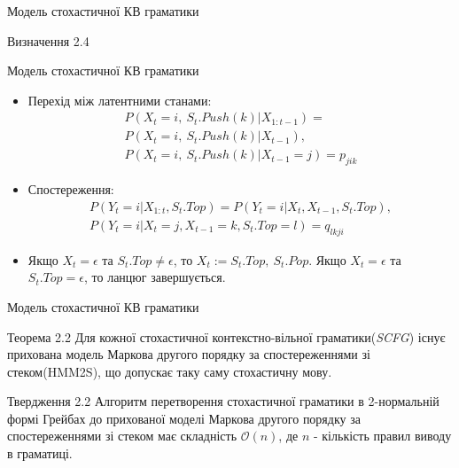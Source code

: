 \documentclass{beamer}
\begin{document}
\begin{darkframes}
\begin{frame}{Модель стохастичної КВ граматики}
\begin{exampleblock}{Визначення 2.4}
\begin{itemize}
        \end{itemize}
      \end{exampleblock}
    \end{frame}

    \begin{frame}{Модель стохастичної КВ граматики}
      \begin{itemize}
        \item Перехід між латентними станами:
        \begin{multline}
          P(X_t = i,\ S_t.Push(k) | X_{1:t-1}) = \\
          P(X_t = i,\ S_t.Push(k) | X_{t-1}),\\
          P(X_t = i,\ S_t.Push(k) | X_{t-1} = j) = p_{jik}
        \end{multline}
        \item Спостереження:
        \begin{multline}
          P(Y_t = i | X_{1:t}, S_t.Top ) = P(Y_t = i | X_t, X_{t-1}, S_t.Top),\\
          P(Y_t = i | X_t = j, X_{t-1} = k, S_t.Top = l) = q_{lkji}
        \end{multline}
        \item Якщо $X_t = \epsilon$ та $ S_t.Top \neq \epsilon $, то $ X_t := S_t.Top,\ S_t.Pop $. Якщо $X_t = \epsilon$ та $ S_t.Top = \epsilon $, то ланцюг завершується.
      \end{itemize}
    \end{frame}

    \begin{frame}{Модель стохастичної КВ граматики}
      \begin{block}{Теорема 2.2}
        Для кожної стохастичної контекстно-вільної граматики(\textit{SCFG}) існує прихована модель Маркова другого порядку за спостереженнями зі стеком(\alert{HMM2S}), що допускає таку саму стохастичну мову.
      \end{block}
      \begin{block}{Твердження 2.2}
      Алгоритм перетворення стохастичної граматики в 2-нормальній формі Грейбах до прихованої моделі Маркова другого порядку за спостереженнями зі стеком має складність $\mathcal{O}(n)$, де $n$ - кількість правил виводу в граматиці.
      \end{block}

    \end{frame}


\end{darkframes}
\end{document}
